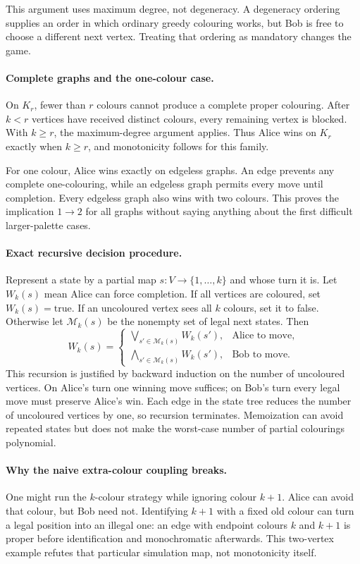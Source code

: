 \documentclass[11pt,a4paper]{article}
\begin{document}
This argument uses maximum degree, not degeneracy. A degeneracy ordering supplies an order in which ordinary greedy colouring works, but Bob is free to choose a different next vertex. Treating that ordering as mandatory changes the game.

\paragraph{Complete graphs and the one-colour case.}
On $K_r$, fewer than $r$ colours cannot produce a complete proper colouring. After $k<r$ vertices have received distinct colours, every remaining vertex is blocked. With $k\ge r$, the maximum-degree argument applies. Thus Alice wins on $K_r$ exactly when $k\ge r$, and monotonicity follows for this family.

For one colour, Alice wins exactly on edgeless graphs. An edge prevents any complete one-colouring, while an edgeless graph permits every move until completion. Every edgeless graph also wins with two colours. This proves the implication $1\to2$ for all graphs without saying anything about the first difficult larger-palette cases.

\paragraph{Exact recursive decision procedure.}
Represent a state by a partial map $s:V\to\{1,\ldots,k\}$ and whose turn it is. Let $W_k(s)$ mean Alice can force completion. If all vertices are coloured, set $W_k(s)=\mathrm{true}$. If an uncoloured vertex sees all $k$ colours, set it to false. Otherwise let $\mathcal M_k(s)$ be the nonempty set of legal next states. Then
\[
W_k(s)=
\begin{cases}
\bigvee_{s'\in\mathcal M_k(s)}W_k(s'),&\text{Alice to move},\\
\bigwedge_{s'\in\mathcal M_k(s)}W_k(s'),&\text{Bob to move}.
\end{cases}
\]
This recursion is justified by backward induction on the number of uncoloured vertices. On Alice's turn one winning move suffices; on Bob's turn every legal move must preserve Alice's win. Each edge in the state tree reduces the number of uncoloured vertices by one, so recursion terminates. Memoization can avoid repeated states but does not make the worst-case number of partial colourings polynomial.

\paragraph{Why the naive extra-colour coupling breaks.}
One might run the $k$-colour strategy while ignoring colour $k+1$. Alice can avoid that colour, but Bob need not. Identifying $k+1$ with a fixed old colour can turn a legal position into an illegal one: an edge with endpoint colours $k$ and $k+1$ is proper before identification and monochromatic afterwards. This two-vertex example refutes that particular simulation map, not monotonicity itself.
\end{document}
